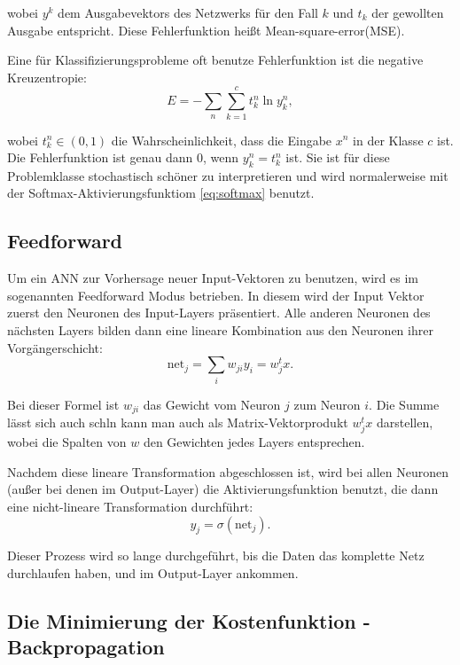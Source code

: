 wobei $y^k$ dem Ausgabevektors des Netzwerks für den Fall $k$ und $t_k$ der gewollten Ausgabe entspricht.
Diese Fehlerfunktion heißt  Mean-square-error(MSE)\cite{bishop1995neural}.

Eine für Klassifizierungsprobleme oft benutze Fehlerfunktion ist die negative Kreuzentropie:
\begin{equation}
\label{eq:crossEntropy}
    E = -\sum_{n} \sum_{k=1}^c t_k^n \ln y_k^n ,
\end{equation}

wobei $t_k^n \in (0,1)$ die Wahrscheinlichkeit, dass die Eingabe $x^n$ in der Klasse $c$ ist. Die Fehlerfunktion ist genau dann $0$, wenn $y_k^n = t_k^n$ ist. 
Sie ist für diese Problemklasse stochastisch schöner zu interpretieren und wird normalerweise mit der Softmax-Aktivierungsfunktiom \ref{eq:softmax} benutzt\cite{bishop1995neural}.

\subsection{Feedforward}
Um ein ANN zur Vorhersage neuer Input-Vektoren zu benutzen, wird es im sogenannten Feedforward Modus betrieben. In diesem wird der Input Vektor zuerst den Neuronen des Input-Layers präsentiert. Alle anderen Neuronen des nächsten Layers bilden dann eine lineare Kombination aus den Neuronen ihrer Vorgängerschicht: 
\begin{equation}
\label{eq:feedforward1}
\text{net}_j = \sum_{i} w_{ji} y_i = w_j^t x.
\end{equation}

Bei dieser Formel ist $w_{ji}$ das Gewicht vom Neuron $j$ zum Neuron $i$. Die Summe lässt sich auch schln kann man auch als Matrix-Vektorprodukt $w_j^t x$ darstellen, wobei die Spalten von $w$ den Gewichten jedes Layers entsprechen. %

Nachdem diese lineare Transformation abgeschlossen ist, wird bei allen Neuronen (außer bei denen im Output-Layer) die Aktivierungsfunktion benutzt, die dann eine nicht-lineare Transformation durchführt: 
\begin{equation}
\label{eq:feedforward2}
y_j = \sigma (\text{net}_j).
\end{equation}

Dieser Prozess wird so lange durchgeführt, bis die Daten das komplette Netz durchlaufen haben, und im Output-Layer ankommen\cite{bishop1995neural}.


\subsection{Die Minimierung der Kostenfunktion - Backpropagation}

